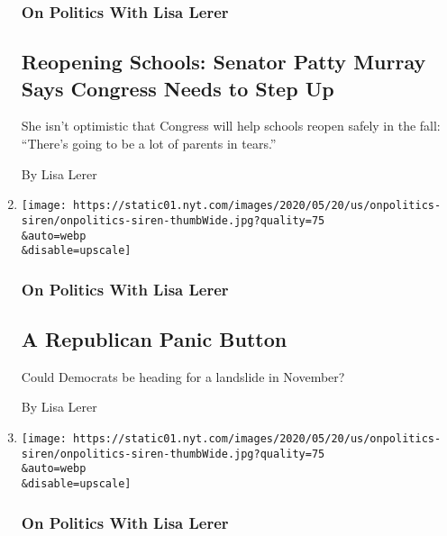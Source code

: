 \begin{enumerate}
  \hypertarget{on-politics-with-lisa-lerer-1}{%
  \subsubsection{On Politics With Lisa
  Lerer}\label{on-politics-with-lisa-lerer-1}}

  \hypertarget{reopening-schools-senator-patty-murray-says-congress-needs-to-step-up}{%
  \subsection{Reopening Schools: Senator Patty Murray Says Congress
  Needs to Step
  Up}\label{reopening-schools-senator-patty-murray-says-congress-needs-to-step-up}}

  She isn't optimistic that Congress will help schools reopen safely in
  the fall: ``There's going to be a lot of parents in tears.''

  By Lisa Lerer
\item
  \href{/2020/07/27/us/politics/a-republican-panic-button.html}{}

  \texttt{[image: https://static01.nyt.com/images/2020/05/20/us/onpolitics-siren/onpolitics-siren-thumbWide.jpg?quality=75\\\&auto=webp\\\&disable=upscale]}

  \hypertarget{on-politics-with-lisa-lerer-2}{%
  \subsubsection{On Politics With Lisa
  Lerer}\label{on-politics-with-lisa-lerer-2}}

  \hypertarget{a-republican-panic-button}{%
  \subsection{A Republican Panic
  Button}\label{a-republican-panic-button}}

  Could Democrats be heading for a landslide in November?

  By Lisa Lerer
\item
  \href{/2020/07/23/us/politics/aoc-women-ted-yoho.html}{}

  \texttt{[image: https://static01.nyt.com/images/2020/05/20/us/onpolitics-siren/onpolitics-siren-thumbWide.jpg?quality=75\\\&auto=webp\\\&disable=upscale]}

  \hypertarget{on-politics-with-lisa-lerer-3}{%
  \subsubsection{On Politics With Lisa
  Lerer}\label{on-politics-with-lisa-lerer-3}}


\end{enumerate}
